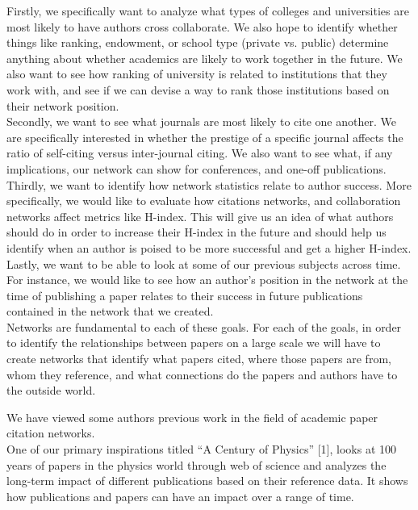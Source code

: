 \documentclass[times, 10pt,twocolumn]{article}
\begin{document}
Firstly, we specifically want to analyze what types of colleges and universities are most likely to have authors cross collaborate. We also hope to identify whether things like ranking, endowment, or school type (private vs. public) determine anything about whether academics are likely to work together in the future. We also want to see how ranking of university is related to institutions that they work with, and see if we can devise a way to rank those institutions based on their network position.\\

Secondly, we want to see what journals are most likely to cite one another. We are specifically interested in whether the prestige of a specific journal affects the ratio of self-citing versus inter-journal citing. We also want to see what, if any implications, our network can show for conferences, and one-off publications.\\

Thirdly, we want to identify how network statistics relate to author success. More specifically, we would like to evaluate how citations networks, and collaboration networks affect metrics like H-index. This will give us an idea of what authors should do in order to increase their H-index in the future and should help us identify when an author is poised to be more successful and get a higher H-index. \\

Lastly, we want to be able to look at some of our previous subjects across time. For instance, we would like to see how an author’s position in the network at the time of publishing a paper relates to their success in future publications contained in the network that we created. \\

Networks are fundamental to each of these goals. For each of the goals, in order to identify the relationships between papers on a large scale we will have to create networks that identify what papers cited, where those papers are from, whom they reference, and what connections do the papers and authors have to the outside world.


We have viewed some authors previous work in the field of academic paper citation networks. \\

One of our primary inspirations titled “A Century of Physics” [1], looks at 100 years of papers in the physics world through web of science and analyzes the long-term impact of different publications based on their reference data. It shows how publications and papers can have an impact over a range of time.\\
\end{document}
